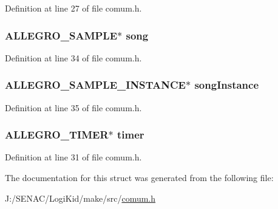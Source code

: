 Definition at line 27 of file comum.\-h.

\hypertarget{struct_game_ade5ece41d11b17eb4b972f2bf0f6910b}{
\subsubsection[{song}]{\setlength{\rightskip}{0pt plus 5cm}A\-L\-L\-E\-G\-R\-O\-\_\-\-S\-A\-M\-P\-L\-E$\ast$ song}}\label{struct_game_ade5ece41d11b17eb4b972f2bf0f6910b}


Definition at line 34 of file comum.\-h.

\hypertarget{struct_game_ae572dbdea486bf303ed756e2a1f30e0b}{
\subsubsection[{song\-Instance}]{\setlength{\rightskip}{0pt plus 5cm}A\-L\-L\-E\-G\-R\-O\-\_\-\-S\-A\-M\-P\-L\-E\-\_\-\-I\-N\-S\-T\-A\-N\-C\-E$\ast$ song\-Instance}}\label{struct_game_ae572dbdea486bf303ed756e2a1f30e0b}


Definition at line 35 of file comum.\-h.

\hypertarget{struct_game_a5a56835e8f246f98761fb994723020cb}{
\subsubsection[{timer}]{\setlength{\rightskip}{0pt plus 5cm}A\-L\-L\-E\-G\-R\-O\-\_\-\-T\-I\-M\-E\-R$\ast$ timer}}\label{struct_game_a5a56835e8f246f98761fb994723020cb}


Definition at line 31 of file comum.\-h.



The documentation for this struct was generated from the following file\-:\begin{DoxyCompactItemize}
\item 
J\-:/\-S\-E\-N\-A\-C/\-Logi\-Kid/make/src/\hyperlink{comum_8h}{comum.\-h}\end{DoxyCompactItemize}
